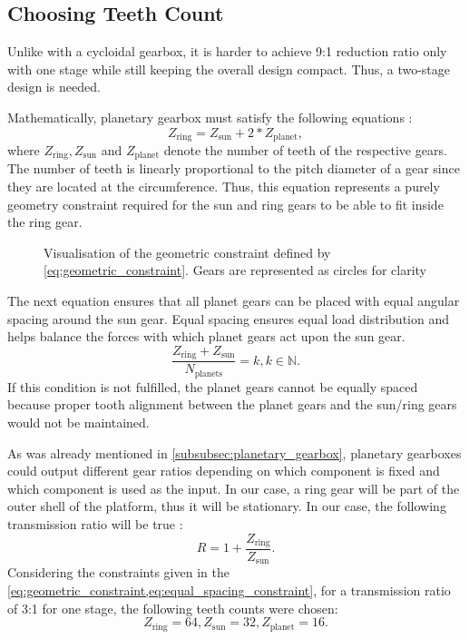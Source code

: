 \subsection{Choosing Teeth Count}
Unlike with a cycloidal gearbox, it is harder to achieve 9:1 reduction ratio only with one stage while still keeping the overall design compact. Thus, a two-stage design is needed.

Mathematically, planetary gearbox must satisfy the following equations \cite{_GearSystemsKHK_}:
\begin{equation}
    Z_{\text{ring}} = Z_{\text{sun}} + 2*Z_{\text{planet}},
    \label{eq:geometric_constraint}
\end{equation}
where $Z_{\text{ring}}, Z_{\text{sun}}$ and $Z_{\text{planet}}$ denote the number of teeth of the respective gears. The number of teeth is linearly proportional to the pitch diameter of a gear since they are located at the circumference. Thus, this equation represents a purely geometry constraint required for the sun and ring gears to be able to fit inside the ring gear.
\begin{figure}[H]
    \caption{Visualisation of the geometric constraint defined by \cref{eq:geometric_constraint}\protect\footnotemark[6]. Gears are represented as circles for clarity}
    
    \label{fig:gearbox_constraint_tikz}
\end{figure}

The next equation ensures that all planet gears can be placed with equal angular spacing around the sun gear. Equal spacing ensures equal load distribution and helps balance the forces with which planet gears act upon the sun gear.
\begin{equation}
    \frac{Z_{\text{ring}}+Z_{\text{sun}}}{N_{\text{planets}}} = k, k \in \mathbb{N}.
    \label{eq:equal_spacing_constraint}
\end{equation}
If this condition is not fulfilled, the planet gears cannot be equally spaced because proper tooth alignment between the planet gears and the sun/ring gears would not be maintained.

As was already mentioned in \cref{subsubsec:planetary_gearbox}, planetary gearboxes could output different gear ratios depending on which component is fixed and which component is used as the input.
In our case, a ring gear will be part of the outer shell of the platform, thus it will be stationary. In our case, the following transmission ratio will be true \cite[sec. Fixed ring gear]{tec-science_TransmissionRatiosPlanetary_2021}:
\begin{equation}
    R = 1+\frac{Z_{\text{ring}}}{Z_{\text{sun}}}.
    \label{eq:transmission ratio}
\end{equation}
Considering the constraints given in the \cref{eq:geometric_constraint,eq:equal_spacing_constraint}, for a transmission ratio of 3:1 for one stage, the following teeth counts were chosen:
\begin{equation}
    Z_{\text{ring}} = 64, Z_{\text{sun}} = 32, Z_{\text{planet}} = 16.
\end{equation}